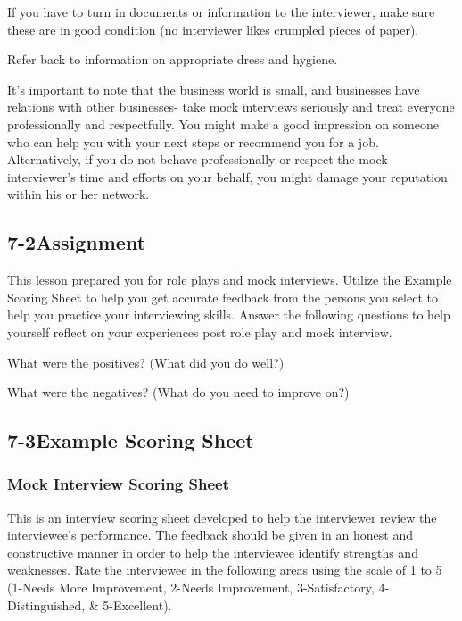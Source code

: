 If you have to turn in documents or information to the interviewer, make sure these are in good condition (no interviewer likes crumpled pieces of paper).

Refer back to information on appropriate dress and hygiene.

It's important to note that the business world is small, and businesses have relations with other businesses- take mock interviews seriously and treat everyone professionally and respectfully. You might make a good impression on someone who can help you with your next steps or recommend you for a job. Alternatively, if you do not behave professionally or respect the mock interviewer's time and efforts on your behalf, you might damage your reputation within his or her network.

\pagebreak \subsection*{7-2\quad Assignment}
This lesson prepared you for role plays and mock interviews. Utilize the Example Scoring Sheet to help you get accurate feedback from the persons you select to help you practice your interviewing skills. Answer the following questions to help yourself reflect on your experiences post role play and mock interview.

What were the positives? (What did you do well?)

What were the negatives? (What do you need to improve on?)

\pagebreak \subsection*{7-3\quad Example Scoring Sheet}
\subsubsection*{Mock Interview Scoring Sheet}
\break This is an interview scoring sheet developed to help the interviewer review the interviewee's performance. The feedback should be given in an honest and constructive manner in order to help the interviewee identify strengths and weaknesses. Rate the interviewee in the following areas using the scale of 1 to 5 (1-Needs More Improvement, 2-Needs Improvement, 3-Satisfactory, 4- Distinguished, \& 5-Excellent).
\pagebreak

